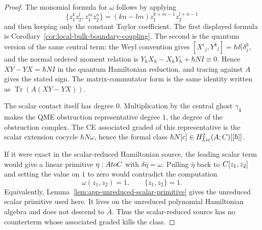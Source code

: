 \begin{proof}
  The monomial formula for \(\omega\) follows by applying
  \[
    \{z_1^kz_2^l,z_1^mz_2^n\}
      =(kn-lm)z_1^{k+m-1}z_2^{l+n-1}
  \]
  and then keeping only the constant Taylor coefficient.
  The first displayed formula is
  Corollary~\ref{cor:local-bulk-boundary-coupling}. The second is the
  quantum version of the same central term: the Weyl convention gives
  \([X^i{}_j,Y^k{}_l]=\hbar\delta^i_l\delta^k_j\), and the normal
  ordered moment relation is
  \(Y_\hbar X_\hbar-X_\hbar Y_\hbar+\hbar N I\equiv0\). Hence
  \(XY-YX=\hbar N I\) in the quantum Hamiltonian reduction, and tracing
  against \(A\) gives the stated sign.  The matrix-commutator form is
  the same identity written as
  \(\operatorname{Tr}(A(XY-YX))\).

  The scalar contact itself has degree \(0\). Multiplication by the
  central ghost \(\gamma_{\mathbf 1}\) makes the QME obstruction
  representative degree \(1\), the degree of the obstruction complex.
  The CE associated graded of this representative is the scalar
  extension cocycle \(\hbar N\omega\), hence the formal class
  \(\hbar N[c]\in H^2_{Lie}(A;C)[[\hbar]]\).

  If it were exact in the scalar-reduced Hamiltonian source, the leading
  scalar term would give a linear primitive
  \(\eta:AtoC\) with
  \(\delta\bar\eta=\omega\). Pulling \(\bar\eta\) back to
  \(C[z_1,z_2]\) and setting the value on \(1\) to zero would contradict
  the computation
  \[
    \omega(z_1,z_2)=1,\qquad \{z_1,z_2\}=1 .
  \]
  Equivalently, Lemma~\ref{lem:app-unreduced-scalar-primitive} gives
  the unreduced scalar primitive used here.  It lives on the unreduced
  polynomial Hamiltonian algebra and does not descend to \(\bar A\).
  Thus the scalar-reduced source has no counterterm whose associated
  graded kills the class.
\end{proof}

